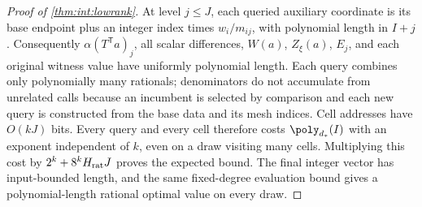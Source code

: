\begin{proof}[Proof of \cref{thm:int:lowrank}]
At level $j\le J$, each queried auxiliary coordinate is its base endpoint
plus an integer index times $w_i/m_{ij}$, with polynomial length in $I+j$.
Consequently $\alpha(T^{\mathsf T}a)_j$, all scalar differences, $W(a)$,
$Z_\xi(a)$, $E_j$, and each original witness value have uniformly
polynomial length. Each query combines only polynomially many rationals;
denominators do not accumulate from unrelated calls because an incumbent
is selected by comparison and each new query is constructed from the base
data and its mesh indices. Cell addresses have $O(kJ)$ bits. Every query
and every cell therefore costs $\poly_{d_*}(I)$ with an exponent
independent of $k$, even on a draw visiting many cells. Multiplying this
cost by $2^k+8^kH_{\rm rat}J$ proves the expected bound. The final integer
vector has input-bounded length, and the same fixed-degree evaluation
bound gives a polynomial-length rational optimal value on every draw.
\end{proof}
